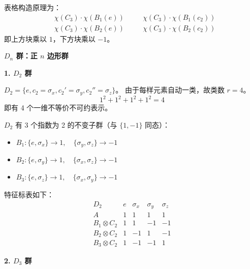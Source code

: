 \begin{example}
    表格构造原理为：
    \begin{equation}
        \begin{aligned}
             & \chi(C_3) \cdot \chi(B_1(e)) & \quad & \chi(C_3) \cdot \chi(B_1(c_2)) \\
             & \chi(C_3) \cdot \chi(B_2(e)) & \quad & \chi(C_3) \cdot \chi(B_2(c_2))
        \end{aligned}
    \end{equation}
    即上方块乘以 $1$，下方块乘以 $-1$。
\end{example}

\begin{example}
    \textbf{$D_n$ 群：正 $n$ 边形群}
    
    \textbf{1. $D_2$ 群}
    
    $D_2 = \{e, c_2=\sigma_x, c_2'=\sigma_y, c_2''=\sigma_z\}$。
    由于每样元素自动一类，故类数 $r=4$。
    \begin{equation}
        1^2 + 1^2 + 1^2 + 1^2 = 4
    \end{equation}
    即有 4 个一维不等价不可约表示。
    
    $D_2$ 有 3 个指数为 2 的不变子群（与 $\{1, -1\}$ 同态）：
    \begin{itemize}
        \item $B_1: \{e, \sigma_x\} \to 1, \quad \{\sigma_y, \sigma_z\} \to -1$
        \item $B_2: \{e, \sigma_y\} \to 1, \quad \{\sigma_x, \sigma_z\} \to -1$
        \item $B_3: \{e, \sigma_z\} \to 1, \quad \{\sigma_x, \sigma_y\} \to -1$
    \end{itemize}
    
    特征标表如下：
    \begin{equation}
        \begin{array}{c|cccc}
            D_2 & e & \sigma_x & \sigma_y & \sigma_z \\
            \hline
            A & 1 & 1 & 1 & 1 \\
            B_1 \otimes C_2 & 1 & 1 & -1 & -1 \\
            B_2 \otimes C_2 & 1 & -1 & 1 & -1 \\
            B_3 \otimes C_2 & 1 & -1 & -1 & 1
        \end{array}
    \end{equation}
    
    \textbf{2. $D_3$ 群}
    

\end{example}
